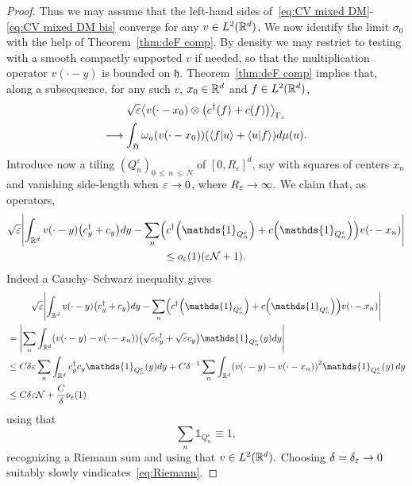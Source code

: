 \documentclass[10pt]{amsart}
\theoremstyle{definition}\newtheorem{defi}[theo]{Definition}\newtheorem{rema}[theo]{Remark}\newtheorem{exam}[theo]{Example}\newtheorem{exem}[theo]{Example}\newtheorem{nota}[theo]{Notation}
\newcommand{\R}{\mathbb{R}}
\newcommand{\cN}{\mathcal{N}}
\newcommand{\gH}{\mathfrak{H}}
\newcommand{\gh}{\mathfrak{h}}
\newcommand{\1}{\mathds{1}}
\newcommand{\eps}{\varepsilon}
\newcommand{\cda}{c^{\dagger}}
\let\oldin\in
\renewcommand{\in}{\mathchoice{\oldin}{\oldin}{\,\oldin\,}{\,\oldin\,}}
\renewcommand*{\to}{\mathchoice{\longrightarrow}{\rightarrow}{\rightarrow}{\rightarrow}}
\let\originalleft\left
\let\originalright\right
\renewcommand{\left}{\mathopen{}\mathclose\bgroup\originalleft}
\renewcommand{\right}{\aftergroup\egroup\originalright}
\begin{document}
\begin{proof}
Thus we may assume that the left-hand sides of~\eqref{eq:CV mixed DM}-\eqref{eq:CV mixed DM bis} converge for any $v\in L^2 (\R^d)$. We now identify the limit $\sigma_0$ with the help of Theorem~\ref{thm:deF comp}. By density we may restrict to testing with a smooth compactly supported $v$ if needed, so that the multiplication operator $v(\cdot-y)$ is bounded on $\gh$. Theorem~\ref{thm:deF comp} implies that, along a subsequence, for any such $v$, $x_0 \in \R^d$ and $f\in L^2 (\R^d)$,
\begin{multline}\label{eq:CV mixed 1}
\sqrt{\eps} \left\langle v (\cdot - x_0) \otimes \left(\cda (f) + c (f) \right)\right\rangle_{\Gamma_\eps}\\
 \to \int_{\gH} \omega_u \left(v (\cdot - x_0)\right) \left(\langle f | u \rangle + \langle u| f \rangle \right) d\mu (u).
\end{multline}
Introduce now a tiling $(Q^\eps_n)_{0\,\leq\,n\,\leq\,N}$ of $[0,R_\eps]^d$, say with squares of centers $x_n$ and vanishing side-length when $\eps \to 0$, where $R_\eps \to \infty$. We claim that, as operators,
\begin{multline}\label{eq:Riemann}
\sqrt{\eps}\left| \int_{\R^d} v(\cdot - y) \left(\cda_y + c_y\right) dy - \sum_n \left(\cda \left(\1_{Q^\eps_n}\right) + c \left(\1_{Q^\eps_n}\right)\right) v(\cdot-x_n)
\right|\\
\leq o_\eps (1) \left(\eps \cN +1\right).
\end{multline}
Indeed a Cauchy--Schwarz inequality gives
\begin{multline*}
\sqrt{\eps}\left| \int_{\R^d} v(\cdot - y) \left(\cda_y + c_y \right) dy - \sum_n \left(\cda \left(\1_{Q^\eps_n}\right) + c \left(\1_{Q^\eps_n}\right)\right) v(\cdot-x_n)
\right|
\\
\begin{aligned}
&= \left| \sum_n \int_{\R^d} \left(v(\cdot - y) - v (\cdot-x_n)\right) \left(\sqrt{\eps}\cda_y + \sqrt{\eps}c_y\right) \1_{Q^\eps_n}(y)dy \right|
\\ 
&\leq C \delta \eps \sum_n \int_{\R^d} \cda_y c_y \1_{Q^\eps_n} (y) dy + C\delta^{-1} \sum_n \int_{\R^d} \left(v(\cdot - y) - v (\cdot-x_n)\right)^2 \1_{Q^\eps_n} (y)\, dy\\
&\leq C \delta \eps \cN + \frac{C}{\delta} o_\eps (1)
\end{aligned}
\end{multline*}
using that
\begin{equation*}
\sum_n \1_{Q^\eps_n} \equiv 1,
\end{equation*}
recognizing a Riemann sum and using that $v \in L^2 (\R^d).$ Choosing $\delta = \delta_\eps \to 0$ suitably slowly vindicates~\eqref{eq:Riemann}.


\end{proof}
\end{document}
